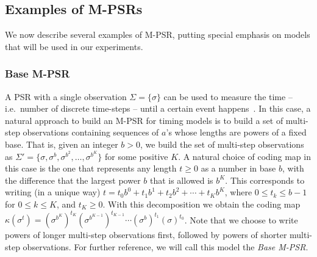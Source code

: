 \subsection{Examples of M-PSRs}

We now describe several examples of M-PSR, putting special emphasis on models that will be used in our experiments.

\subsubsection{Base M-PSR}
A PSR with a single observation $\Sigma = \{\sigma\}$ can be used to measure the time -- i.e.\ number of discrete time-steps -- until a certain event happens~\cite{ODM}. In this case, a natural approach to build an M-PSR for timing models is to build a set of multi-step observations containing sequences of $a$'s whose lengths are powers of a fixed base. That is, given an integer $b > 0$, we build the set of multi-step observations as $\Sigma' = \{\sigma,\sigma^b, \sigma^{b^2}, \ldots, \sigma^{b^K}\}$ for some positive $K$. A natural choice of coding map in this case is the one that represents any length $t \geq 0$ as a number in base $b$, with the difference that the largest power $b$ that is allowed is $b^K$. This corresponds to writing (in a unique way) $t = t_0 b^0 + t_1 b^1 + t_2 b^2 + \cdots + t_K b^K$, where $0 \leq t_k \leq b - 1$ for $0 \leq k \leq K$, and $t_K \geq 0$. With this decomposition we obtain the coding map $\kappa(\sigma^t) = (\sigma^{b^K})^{t_K} (\sigma^{b^{K-1}})^{t_{K-1}} \cdots (\sigma^b)^{t_1} (\sigma)^{t_0}$. Note that we choose to write powers of longer multi-step observations first, followed by powers of shorter multi-step observations. For further reference, we will call this model the \emph{Base M-PSR}.

